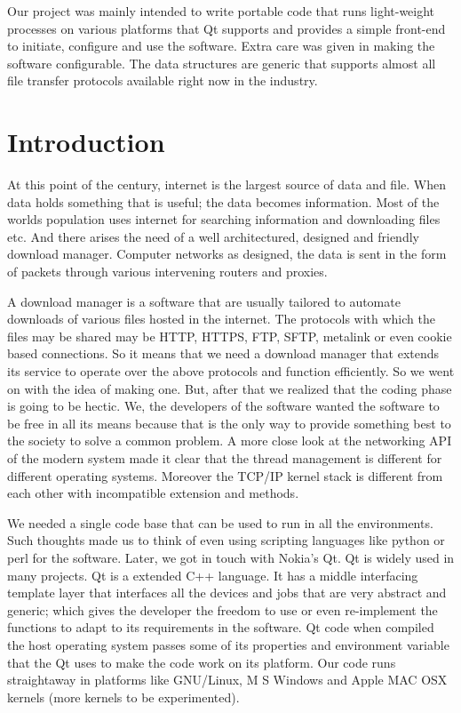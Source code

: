\documentclass[pdftex,12pt,a4paper,pdfencoding=unicode]{article}
\begin{document}
\begin{onehalfspace}
                Our project was mainly intended to write portable code that runs light-weight processes on various
                platforms that Qt supports and provides a simple front-end to initiate, configure and use the software.
                Extra care was given in making the software configurable. The data structures are generic that supports
                almost all file transfer protocols available right now in the industry.


\newpage
\tableofcontents
\thispagestyle{empty}
\newpage
\listoffigures
\thispagestyle{empty}
\newpage
\pagestyle{fancy}
\section{Introduction}
\setcounter{page}{1}
At this point of the century, internet is the largest source of data and file. When data holds something that is useful; the
data becomes information. Most of the worlds population uses internet for searching information and downloading files etc.
And there arises the need of a well architectured, designed and friendly download manager. Computer networks as designed,
the data is sent in the form of packets through various intervening routers and proxies.

A download manager is a software that are usually tailored to automate downloads of various files hosted in the internet. The
protocols with which the files may be shared may be HTTP, HTTPS, FTP, SFTP, metalink or even cookie based connections. So it means that
we need a download manager that extends its service to operate over the above protocols and function efficiently. So we went on with
the idea of making one. But, after that we realized that the coding phase is going to be hectic. We, the developers of the software
wanted the software to be free in all its means because that is the only way to provide something best to the society to solve a common
problem. A more close look at the networking API of the modern system made it clear that the thread management is different for different
operating systems. Moreover the TCP/IP kernel stack is different from each other with incompatible extension and methods.

We needed a single code base that can be used to run in all the environments. Such thoughts made us to think of even using scripting
languages like python or perl for the software. Later, we got in touch with Nokia's Qt. Qt is widely used in many projects. Qt is a
extended C++ language. It has a middle interfacing template layer that interfaces all the devices and jobs that are very abstract and
generic; which gives the developer the freedom to use or even re-implement the functions to adapt to its requirements in the software.
Qt code when compiled the host operating system passes some of its properties and environment variable that the Qt uses to make the
code work on its platform. Our code runs straightaway in platforms like GNU/Linux, M S Windows and Apple MAC OSX kernels (more kernels 
to be experimented). 
\end{onehalfspace}
\end{document}
